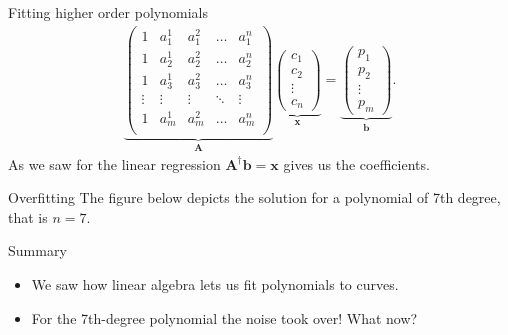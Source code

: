 \documentclass[notes]{beamer}
\begin{document}
    \begin{frame}{Fitting higher order polynomials}
      \begin{align}
        \underbrace{
        \begin{pmatrix}
          1       & a_1^1    & a_1^2  & \dots & a_1^n  \\ 
          1       & a_2^1    & a_2^2  & \dots & a_2^n  \\
          1       & a_3^1    & a_3^2  & \dots & a_3^n  \\
          \vdots  & \vdots    & \vdots  & \ddots & \vdots \\ 
          1       & a_m^1    & a_m^2  & \dots & a_m^n  \\
        \end{pmatrix}
        }_{\mathbf{A}}
        \underbrace{
        \begin{pmatrix}
          c_1 \\ c_2 \\ \vdots \\ c_n  
        \end{pmatrix}
        }_{\mathbf{x}}
        =
        \underbrace{
        \begin{pmatrix}
          p_1 \\
          p_2 \\
          \vdots \\ 
          p_m  
        \end{pmatrix}
        }_{\mathbf{b}}
        .
      \end{align}
      As we saw for the linear regression $\mathbf{A}^{\dagger}\mathbf{b} = \mathbf{x}$
      gives us the coefficients.
    \end{frame}

    \begin{frame}{Overfitting}
      The figure below depicts the solution for a polynomial of 7th degree, that is $n=7$.
      \begin{figure}
        \centering
        
      \end{figure}
    \end{frame}

    \begin{frame}{Summary}
      \begin{itemize}
        \item We saw how linear algebra lets us fit polynomials to curves. 
        \item For the 7th-degree polynomial the noise took over! What now?
      \end{itemize}
    \end{frame}
\end{document}

